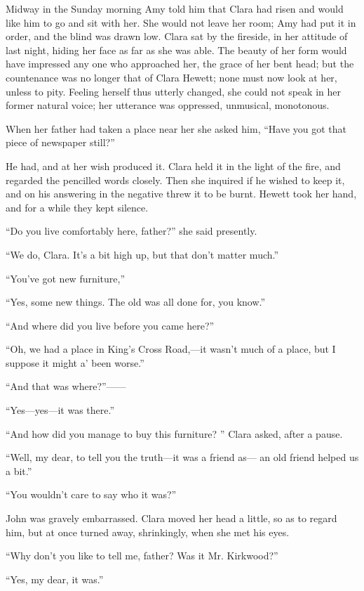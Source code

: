 Midway in the Sunday morning Amy told him that Clara had risen and would
like him to go and sit with her. She would not leave her room; Amy had
put it in order, and the blind was drawn low. Clara sat by the fireside,
in her attitude of last night, hiding her face as far as she was able.
The beauty of her form would have impressed any one who approached her,
the grace of her bent head; but the countenance was no longer that of
Clara Hewett; none must now look at her, unless to pity. Feeling herself
thus utterly changed, she could not speak in her former natural voice;
her utterance was oppressed, unmusical, monotonous.

When her father had taken a place near her
{\protect\hypertarget{302}{}{}}she asked him, ``Have you got that piece
of newspaper still?''

He had, and at her wish produced it. Clara held it in the light of the
fire, and regarded the pencilled words closely. Then she inquired if he
wished to keep it, and on his answering in the negative threw it to be
burnt. Hewett took her hand, and for a while they kept silence.

``Do you live comfortably here, father?'' she said presently.

``We do, Clara. It's a bit high up, but that don't matter much.''

``You've got new furniture,''

``Yes, some new things. The old was all done for, you know.''

``And where did you live before you came here?''

``Oh, we had a place in King's Cross Road,---it wasn't much of a place,
but I suppose it might a' been worse.''

``And that was where?''{{------}}

``Yes---yes---it was there.''

``And how did you manage to buy this furniture? '' Clara asked, after a
pause.

{\protect\hypertarget{303}{}{}}``Well, my dear, to tell you the
truth---it was a friend as--- an old friend helped us a bit.''

``You wouldn't care to say who it was?''

John was gravely embarrassed. Clara moved her head a little, so as to
regard him, but at once turned away, shrinkingly, when she met his eyes.

``Why don't you like to tell me, father? Was it Mr. Kirkwood?''

``Yes, my dear, it was.''

